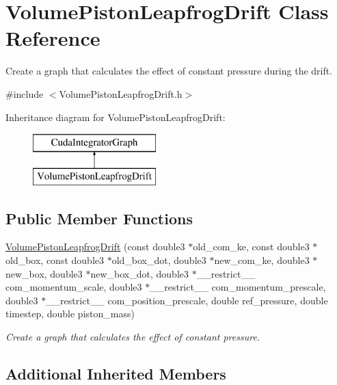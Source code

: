 \hypertarget{classVolumePistonLeapfrogDrift}{}\section{Volume\+Piston\+Leapfrog\+Drift Class Reference}
\label{classVolumePistonLeapfrogDrift}


Create a graph that calculates the effect of constant pressure during the drift.  




{\ttfamily \#include $<$Volume\+Piston\+Leapfrog\+Drift.\+h$>$}

Inheritance diagram for Volume\+Piston\+Leapfrog\+Drift\+:\begin{figure}[H]
\begin{center}
\leavevmode
\includegraphics[height=2.000000cm]{classVolumePistonLeapfrogDrift}
\end{center}
\end{figure}
\subsection*{Public Member Functions}
\begin{DoxyCompactItemize}
\item 
\hyperlink{classVolumePistonLeapfrogDrift_a3872d09e073ce1b58d0a70beab29e487}{Volume\+Piston\+Leapfrog\+Drift} (const double3 $\ast$old\+\_\+com\+\_\+ke, const double3 $\ast$old\+\_\+box, const double3 $\ast$old\+\_\+box\+\_\+dot, double3 $\ast$new\+\_\+com\+\_\+ke, double3 $\ast$new\+\_\+box, double3 $\ast$new\+\_\+box\+\_\+dot, double3 $\ast$\+\_\+\+\_\+restrict\+\_\+\+\_\+ com\+\_\+momentum\+\_\+scale, double3 $\ast$\+\_\+\+\_\+restrict\+\_\+\+\_\+ com\+\_\+momentum\+\_\+prescale, double3 $\ast$\+\_\+\+\_\+restrict\+\_\+\+\_\+ com\+\_\+position\+\_\+prescale, double ref\+\_\+pressure, double timestep, double piston\+\_\+mass)
\begin{DoxyCompactList}\small\item\em Create a graph that calculates the effect of constant pressure. \end{DoxyCompactList}\end{DoxyCompactItemize}
\subsection*{Additional Inherited Members}


